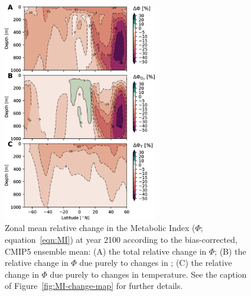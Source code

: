 \documentclass{report_chapter}
\begin{document}
\begin{figure}[p]
\centering
\includegraphics[width=0.6\textwidth]{metabolic-index-change-zonal.png}
\caption{Zonal mean relative change in the Metabolic Index ($\Phi$; equation~\ref{eqn:MI}) at year 2100 according to the bias-corrected, CMIP5 ensemble mean:
(A) the total relative change in $\Phi$; (B) the relative change in $\Phi$ due purely to changes in \OO{}; (C) the relative change in $\Phi$ due purely to changes in temperature.
See the caption of Figure~\ref{fig:MI-change-map} for further details.
}
\label{fig:MI-change-zonal}
\end{figure}
\end{document}
